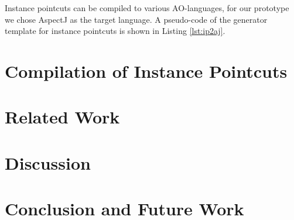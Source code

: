 \documentclass{llncs}
\begin{document}
Instance pointcuts can be compiled to various AO-languages, for our prototype we chose AspectJ as the target language. A pseudo-code of the generator template for instance pointcuts is shown in Listing \ref{lst:ip2aj}. 


\section{Compilation of Instance Pointcuts}

\section{Related Work}
\section{Discussion}
\section{Conclusion and Future Work}
\end{document}
